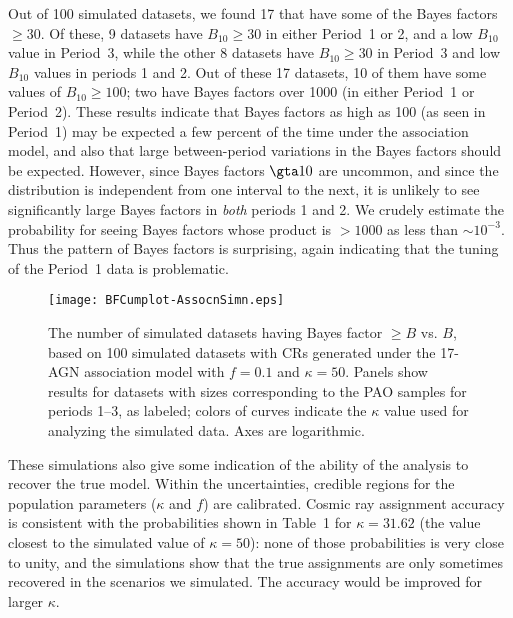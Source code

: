 Out of 100 simulated datasets, we found 17 that have some of the Bayes
factors $\geq 30$.  Of these, 9 datasets have $B_{10}\geq 30$ in either
Period~1 or 2, and a low $B_{10}$ value in Period~3, while the other 8
datasets have $B_{10}\geq 30$ in Period~3 and low $B_{10}$ values in periods
1 and 2.  Out of these 17 datasets, 10 of them have some values of
$B_{10}\geq 100$; two have Bayes factors over 1000 (in either Period~1
or Period~2).
These results indicate that Bayes factors as high as 100 (as seen in Period~1)
may be expected a few percent of the time under the association model, and
also that large between-period variations in the Bayes factors should be
expected.  However, since Bayes factors $\gta 10$ are uncommon, and since the
distribution is independent from one interval to the next, it is unlikely to
see significantly large Bayes factors in {\em both} periods 1 and 2.  We
crudely estimate the probability for seeing Bayes factors whose product
is $> 1000$ as less than $\sim 10^{-3}$.  Thus the pattern of Bayes factors is
surprising, again indicating that the tuning of the Period~1 data is
problematic.

\begin{figure}
\centerline{\texttt{[image: BFCumplot-AssocnSimn.eps]}}
\caption{The number of simulated datasets having Bayes factor $\geq B$
vs. $B$, based on 100 simulated datasets with CRs generated under the
17-AGN association model with $f=0.1$ and $\kappa=50$.  Panels show
results for datasets with sizes corresponding to the PAO samples for
periods 1--3, as labeled; colors of curves indicate the $\kappa$ value
used for analyzing the simulated data.  Axes are logarithmic.}
\label{fig:assocCumBF}
\end{figure}

These simulations also give some indication of the ability of the analysis
to recover the true model.  Within the uncertainties,
credible regions for the population parameters ($\kappa$ and $f$) are
calibrated.  Cosmic ray assignment accuracy is consistent with the probabilities
shown in Table~1 for $\kappa=31.62$ (the value closest to the simulated
value of $\kappa=50$):  none of those probabilities is very close to unity, and
the simulations show that the true assignments are only sometimes recovered
in the scenarios we simulated.  The accuracy would be improved for
larger $\kappa$.
